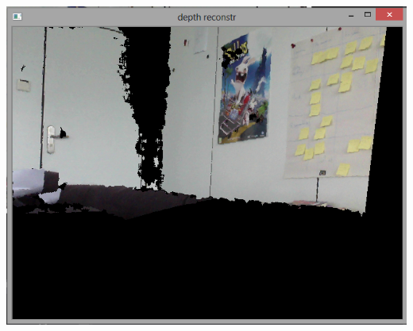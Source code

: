 \begin{center}
	\includegraphics[scale=0.8]{images/depth_reconstruction_1.png}
	\label{fig:depth_reconstr}
\end{center}   
